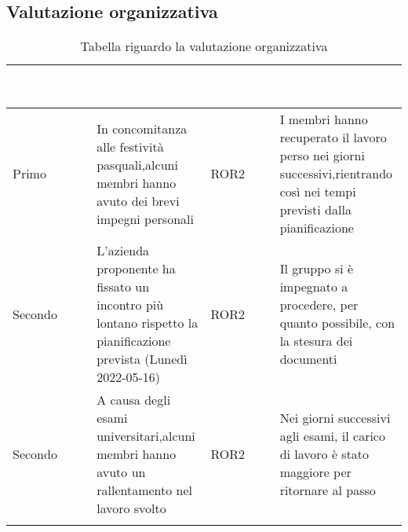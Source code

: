 \subsection{Valutazione organizzativa}
{
    \setlength{\freewidth}{\dimexpr\textwidth-10\tabcolsep}
    \renewcommand{\arraystretch}{1.5}
    \centering
    \setlength{\aboverulesep}{0pt}
    \setlength{\belowrulesep}{0pt}
    \begin{longtable}{C{.25\freewidth} C{.257\freewidth} C{.16\freewidth} C{.4\freewidth}}
       \toprule
    \textcolor{white}{\textbf{Incremento}}&
    \textcolor{white}{\textbf{Problema emerso}}&
    \textcolor{white}{\textbf{Rischio associato}}&
    \textcolor{white}{\textbf{Soluzione migliorativa}}\\	
    \toprule
    \endhead
    
   Primo & In concomitanza alle festività pasquali,alcuni membri hanno avuto dei brevi impegni personali & 
          ROR2 &I membri hanno recuperato il lavoro perso nei giorni successivi,rientrando così nei tempi previsti dalla pianificazione \\
   Secondo & L'azienda proponente ha fissato un incontro più lontano rispetto la pianificazione prevista (Lunedì 2022-05-16) &
            ROR2 & Il gruppo si è impegnato a procedere, per quanto possibile, con la stesura dei documenti \\
   Secondo & A causa degli esami universitari,alcuni membri hanno avuto un rallentamento nel lavoro svolto & 
           ROR2 & Nei giorni successivi agli esami, il carico di lavoro è stato maggiore per ritornare al passo \\
    
   \bottomrule
   \caption{Tabella riguardo la valutazione organizzativa}
   \end{longtable}
}

\newpage
